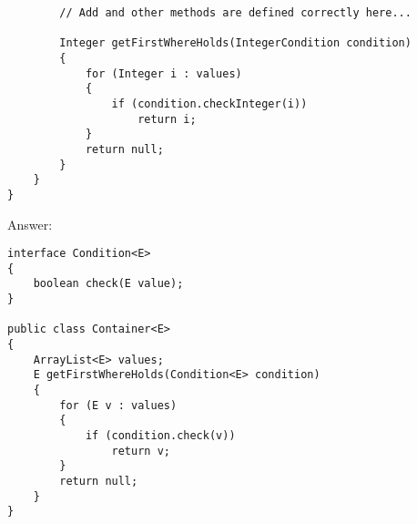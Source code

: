\documentclass[11pt]{article}
\newenvironment{answer}{\large\lstset{basicstyle=\large\ttfamily}\color{white} \small{Answer:}}{}
\newenvironment{answer}{\large\lstset{basicstyle=\large\ttfamily}\color{red} \small{Answer:}}{}
\begin{document}
\begin{enumerate}
\begin{lstlisting}
		// Add and other methods are defined correctly here...

		Integer getFirstWhereHolds(IntegerCondition condition)
		{
			for (Integer i : values)
			{
				if (condition.checkInteger(i))
					return i;
			}
			return null;
		}
	}
}
\end{lstlisting}

\begin{answer}
\begin{lstlisting}
interface Condition<E>
{
	boolean check(E value);
}

public class Container<E>
{
	ArrayList<E> values;
	E getFirstWhereHolds(Condition<E> condition)
	{
		for (E v : values)
		{
			if (condition.check(v))
				return v;
		}
		return null;
	}
}
\end{lstlisting}
\end{answer}






\end{enumerate}
\end{document}
